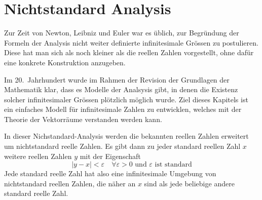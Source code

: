 %
%
%
\chapter{Nichtstandard Analysis%
\label{chapter:nonstandardanalysis}}
\rhead{}
Zur Zeit von Newton, Leibniz und Euler war es üblich, zur Begründung der
Formeln der Analysis nicht weiter definierte infinitesimale Grössen
zu postulieren.
Diese hat man sich als noch kleiner als die reellen Zahlen vorgestellt,
ohne dafür eine konkrete Konstruktion anzugeben.

Im 20.~Jahrhundert wurde im Rahmen der Revision der Grundlagen der Mathematik
klar, dass es Modelle der Analsysis gibt, in denen die Existenz solcher
infinitesimaler Grössen plötzlich möglich wurde.
Ziel dieses Kapitels ist ein einfaches Modell für infinitesimale 
Zahlen zu entwicklen, welches mit der Theorie der Vektorräume
verstanden werden kann.

In dieser Nichstandard-Analysis werden die bekannten reellen Zahlen
erweitert um nichtstandard reelle Zahlen.
Es gibt dann zu jeder standard reellen Zahl $x$ weitere reellen Zahlen $y$ 
mit der Eigenschaft
\[
|y - x| < \varepsilon\quad\forall \varepsilon > 0 \text{ und $\varepsilon$ ist standard}
\]
Jede standard reelle Zahl hat also eine infinitesimale Umgebung von 
nichtstandard reellen Zahlen, die näher an $x$ sind als jede beliebige
andere standard reelle Zahl.







